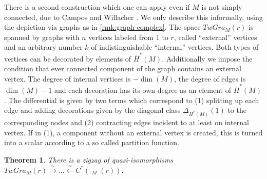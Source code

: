 \documentclass{scrartcl}
\theoremstyle{plain}
\newtheorem{theorem}{Theorem}[section]
\theoremstyle{definition}
\newcommand{\abs}[1]{\left\lvert#1\right\rvert}
\renewcommand{\subset}{\subseteq}
\newcommand{\quiso}{\simeq}
\let\xto\xrightarrow
\let\xfrom\xleftarrow
\DeclareMathOperator{\cConf}{\overline{Conf}}
\begin{document}
There is a second construction which one can apply even if $M$ is not simply connected, due to Campos and Willacher \cite{campos2016model}. We only describe this informally, using the depiction via graphs as in \cref{rmk:graph-complex}. The space $TwGra_M(r)$ is spanned by graphs with $n$ vertices labeled from $1$ to $r$, called ``external'' vertices and an arbitrary number $k$ of indistinguishable ``internal'' vertices. Both types of vertices can be decorated by elements of $\bar H^*(M)$. Additionally we impose the condition that ever connected component of the graph contains an external vertex. The degree of internal vertices is $-\dim(M)$, the degree of edges is $\dim(M)-1$ and each decoration has its own degree as an element of $\bar H^*(M)$. The differential is given by two terms which correspond to (1) splitting up each edge and adding decorations given by the diagonal class $\Delta_{H^*(M)}(1)$ to the corresponding nodes and (2) contracting edges incident to at least on internal vertex. If in (1), a component without an external vertex is created, this is turned into a scalar according to a so called partition function. 

\begin{theorem}
    There is a zigzag of quasi-isomorphisms $TwGra_M(r)\xto{\quiso}\dots\xfrom{\quiso} C^*(\cConf_M(r))$.
\end{theorem}


\end{document}
